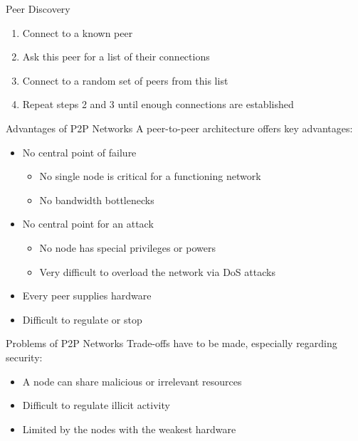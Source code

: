 \documentclass[handout]{beamer}
\begin{document}
\begin{frame}{Peer Discovery}
	\begin{figure}
		
	\end{figure}
	\begin{enumerate}
		\item<2-> Connect to a known peer
		\item<3-> Ask this peer for a list of their connections
		\item<4-> Connect to a random set of peers from this list
		\item<5-> Repeat steps 2 and 3 until enough connections are established
	\end{enumerate}
\end{frame}

\begin{frame}{Advantages of P2P Networks}
	A peer-to-peer architecture offers key advantages:
	\vspace{0.3 cm}
	\begin{itemize}
		\item No central point of failure
		\begin{itemize}
			\item No single node is critical for a functioning network
			\item No bandwidth bottlenecks
		\end{itemize}
		\vspace{0.3 cm}
		\item<2-> No central point for an attack
			\begin{itemize}
				\item No node has special privileges or powers
				\item Very difficult to overload the network via DoS attacks
			\end{itemize}	
		\vspace{0.3 cm}
		\item<3-> Every peer supplies hardware
		\vspace{0.3 cm}
		\item<4-> Difficult to regulate or stop
	\end{itemize}
	
\end{frame}

\begin{frame}{Problems of P2P Networks}
	Trade-offs have to be made, especially regarding security:
	\vspace{0.3 cm}
	\begin{itemize}
		\item A node can share malicious or irrelevant resources
		\vspace{0.3 cm}
		\item<2-> Difficult to regulate illicit activity
		\vspace{0.3 cm}
		\item<3-> Limited by the nodes with the weakest hardware
	\end{itemize}
	
\end{frame}
\end{document}
